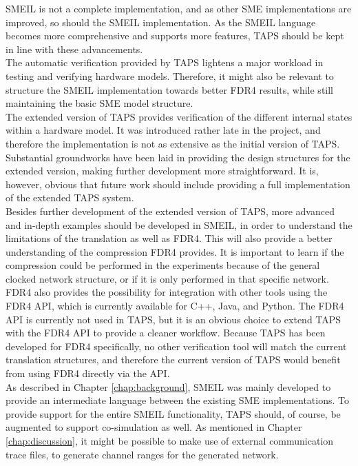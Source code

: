 
SMEIL is not a complete implementation, and as other SME implementations are improved, so should the SMEIL implementation. As the SMEIL language becomes more comprehensive and supports more features, TAPS should be kept in line with these advancements.\\
The automatic verification provided by TAPS lightens a major workload in testing and verifying hardware models. Therefore, it might also be relevant to structure the SMEIL implementation towards better FDR4 results, while still maintaining the basic SME model structure. \\

The extended version of TAPS provides verification of the different internal states within a hardware model. It was introduced rather late in the project, and therefore the implementation is not as extensive as the initial version of TAPS. Substantial groundworks have been laid in providing the design structures for the extended version, making further development more straightforward. It is, however, obvious that future work should include providing a full implementation of the extended TAPS system. \\

Besides further development of the extended version of TAPS, more advanced and in-depth examples should be developed in SMEIL, in order to understand the limitations of the translation as well as FDR4. This will also provide a better understanding of the compression FDR4 provides. It is important to learn if the compression could be performed in the experiments because of the general clocked network structure, or if it is only performed in that specific network. \\

FDR4 also provides the possibility for integration with other tools using the FDR4 API, which is currently available for C++, Java, and Python. The FDR4 API is currently not used in TAPS, but it is an obvious choice to extend TAPS with the FDR4 API to provide a cleaner workflow. Because TAPS has been developed for FDR4 specifically, no other verification tool will match the current translation structures, and therefore the current version of TAPS would benefit from using FDR4 directly via the API.\\

As described in Chapter \ref{chap:background}, SMEIL was mainly developed to provide an intermediate language between the existing SME implementations.
To provide support for the entire SMEIL functionality, TAPS should, of course, be augmented to support co-simulation as well. As mentioned in Chapter \ref{chap:discussion}, it might be possible to make use of external communication trace files, to generate channel ranges for the generated \cspm{} network.\\

